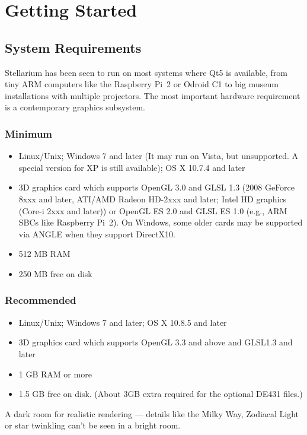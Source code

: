 

\chapter{Getting Started}
\label{ch:GettingStarted}

\section{System Requirements}
\label{sec:GettingStarted:SystemRequirements}

Stellarium has been seen to run on most systems where Qt5 is
available, from tiny ARM computers like the Raspberry Pi~2 or Odroid
C1 to big museum installations with multiple projectors. The most
important hardware requirement is a contemporary graphics subsystem.


\subsection{Minimum}
\begin{itemize}
\item Linux/Unix; Windows 7 and later (It may run on Vista, but unsupported. A special version for XP is still available); OS X 10.7.4 and later
\item 3D graphics card which supports OpenGL 3.0 and GLSL 1.3 (2008
  GeForce 8xxx and later, ATI/AMD Radeon HD-2xxx and later; Intel HD
  graphics (Core-i 2xxx and later)) or OpenGL ES 2.0 and GLSL ES 1.0
  (e.g., ARM SBCs like Raspberry Pi~2). On Windows, some older cards
  may be supported via ANGLE when they support DirectX10.
\item 512 MB RAM
\item 250 MB free on disk
\end{itemize}

\subsection{Recommended}
\begin{itemize}
\item Linux/Unix; Windows 7 and later; OS X 10.8.5 and later
\item 3D graphics card which supports OpenGL 3.3 and above and GLSL1.3 and later
\item 1 GB RAM or more
\item 1.5 GB free on disk. (About 3GB extra required for the optional DE431 files.)
\end{itemize}
 A dark room for realistic rendering --- details like the Milky Way, Zodiacal Light or
star twinkling can't be seen in a bright room.


